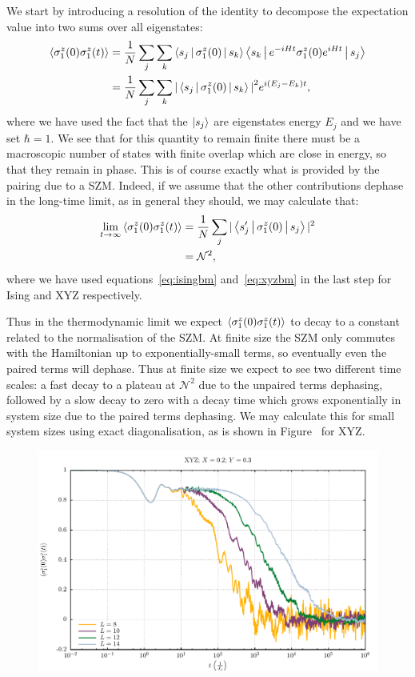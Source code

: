 \documentclass [a4paper, 11pt]{article}
\begin{document}
We start by introducing a resolution of the identity to decompose the expectation value into two sums over all eigenstates:
\begin{align}
\Braket{\sigma^z_1(0)\sigma^z_1(t)} &= \frac{1}{N}\sum_j \sum_k \Braket{s_j |\sigma^z_1(0)| s_k}\Braket{s_k|e^{-i H t}\sigma^z_1(0)e^{i H t}|s_j} \\
&= \frac{1}{N}\sum_j \sum_k{|\Braket{s_j |\sigma^z_1(0)| s_k}|}^2 e^{i\left(E_j-E_k\right)t},
\end{align}
where we have used the fact that the $\ket{s_j}$ are eigenstates energy $E_j$ and we have set $\hbar =1$. We see that for this quantity to remain finite there must be a macroscopic number of states with finite overlap which are close in energy, so that they remain in phase. This is of course exactly what is provided by the pairing due to a SZM. Indeed, if we assume that the other contributions dephase in the long-time limit, as in general they should, we may calculate that:
\begin{align}
 \lim_{t\to\infty}\Braket{\sigma^z_1(0)\sigma^z_1(t)} &=  \frac{1}{N}\sum_j |\Braket{s_j^\prime |\sigma^z_1(0)| s_j}|^2 \\
&= \mathcal{N}^2,
 \label{eq:decaytonorm}
\end{align}
where we have used equations~\eqref{eq:isingbm} and~\eqref{eq:xyzbm} in the last step for Ising and XYZ respectively.

Thus in the thermodynamic limit we expect $\Braket{\sigma^z_1(0)\sigma^z_1(t)}$ to decay to a constant related to the normalisation of the SZM. At finite size the SZM only commutes with the Hamiltonian up to exponentially-small terms, so eventually even the paired terms will dephase. Thus at finite size we expect to see two different time scales: a fast decay to a plateau at $\mathcal{N}^2$ due to the unpaired terms dephasing, followed by a slow decay to zero with a decay time which grows exponentially in system size due to the paired terms dephasing. We may calculate this for small system sizes using exact diagonalisation, as is shown in Figure~\cite{XYZ_decay} for XYZ.

\begin{figure} [htbp]
\centering
 \includegraphics[width=\linewidth]{XYZ_log_decay.pdf}
\caption{}
\label{fig:XYZ_decay}
\end{figure}
\end{document}
